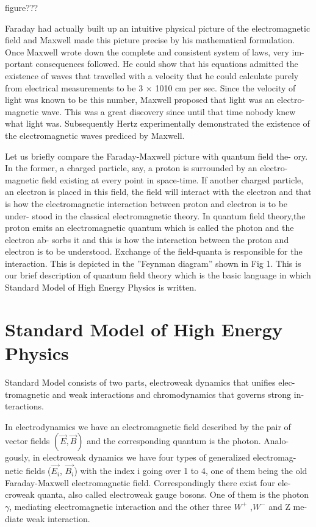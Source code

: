 figure???


Faraday had actually built up an intuitive physical picture of the electromagnetic
field and Maxwell made this picture precise by his mathematical formulation.
Once Maxwell wrote down the complete and consistent system of laws, very im-
portant consequences followed. He could show that his equations admitted the
existence of waves that travelled with a velocity that he could calculate purely
from electrical measurements to be 3 × 1010 cm per sec. Since the velocity of
light was known to be this number, Maxwell proposed that light was an electro-
magnetic wave. This was a great discovery since until that time nobody knew
what light was. Subsequently Hertz experimentally demonstrated the existence of
the electromagnetic waves prediced by Maxwell.

Let us briefly compare the Faraday-Maxwell picture with quantum field the-
ory. In the former, a charged particle, say, a proton is surrounded by an electro-
magnetic field existing at every point in space-time. If another charged particle,
an electron is placed in this field, the field will interact with the electron and that
is how the electromagnetic interaction between proton and electron is to be under-
stood in the classical electromagnetic theory. In quantum field theory,the proton
emits an electromagnetic quantum which is called the photon and the electron ab-
sorbs it and this is how the interaction between the proton and electron is to be
understood. Exchange of the field-quanta is responsible for the interaction. This
is depicted in the ”Feynman diagram” shown in Fig 1. This is our brief description
of quantum field theory which is the basic language in which Standard Model of
High Energy Physics is written.

\section*{Standard Model of High Energy Physics}


Standard Model consists of two parts, electroweak dynamics that unifies elec-
tromagnetic and weak interactions and chromodynamics that governs strong in-
teractions.


In electrodynamics we have an electromagnetic field described by the pair
of vector fields $(\vec{E}, \vec{B})$ and the corresponding quantum is the photon. Analo-
gously, in electroweak dynamics we have four types of generalized electromag-
netic fields ($\vec{E_{i}}$, $\vec{B_{i}}$) with the index i going over 1 to 4, one of them being the
old Faraday-Maxwell electromagnetic field. Correspondingly there exist four ele-
croweak quanta, also called electroweak gauge bosons. One of them is the photon
$\gamma$, mediating electromagnetic interaction and the other three $W^{+}$ ,$W^{-}$ and Z me-
diate weak interaction.

